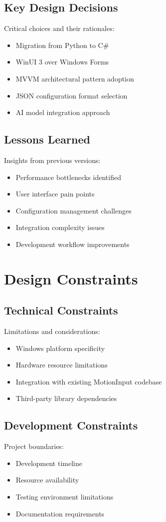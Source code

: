\subsection{Key Design Decisions}
Critical choices and their rationales:
\begin{itemize}
    \item Migration from Python to C\#
    \item WinUI 3 over Windows Forms
    \item MVVM architectural pattern adoption
    \item JSON configuration format selection
    \item AI model integration approach
\end{itemize}

\subsection{Lessons Learned}
Insights from previous versions:
\begin{itemize}
    \item Performance bottlenecks identified
    \item User interface pain points
    \item Configuration management challenges
    \item Integration complexity issues
    \item Development workflow improvements
\end{itemize}

\section{Design Constraints}
\subsection{Technical Constraints}
Limitations and considerations:
\begin{itemize}
    \item Windows platform specificity
    \item Hardware resource limitations
    \item Integration with existing MotionInput codebase
    \item Third-party library dependencies
\end{itemize}

\subsection{Development Constraints}
Project boundaries:
\begin{itemize}
    \item Development timeline
    \item Resource availability
    \item Testing environment limitations
    \item Documentation requirements
\end{itemize}

